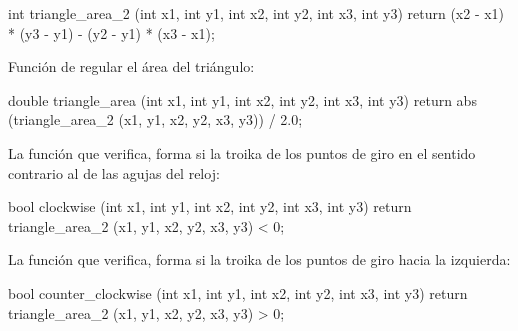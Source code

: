 \code
int triangle_area_2 (int x1, int y1, int x2, int y2, int x3, int y3) {
return (x2 - x1) * (y3 - y1) - (y2 - y1) * (x3 - x1);
}
\endcode

Función de regular el área del triángulo:

\code
double triangle_area (int x1, int y1, int x2, int y2, int x3, int y3) {
return abs (triangle_area_2 (x1, y1, x2, y2, x3, y3)) / 2.0;
}
\endcode

La función que verifica, forma si la troika de los puntos de giro en el sentido contrario al de las agujas del reloj:

\code
bool clockwise (int x1, int y1, int x2, int y2, int x3, int y3) {
return triangle_area_2 (x1, y1, x2, y2, x3, y3) < 0;
}
\endcode

La función que verifica, forma si la troika de los puntos de giro hacia la izquierda:

\code
bool counter_clockwise (int x1, int y1, int x2, int y2, int x3, int y3) {
return triangle_area_2 (x1, y1, x2, y2, x3, y3) > 0;
}
\endcode